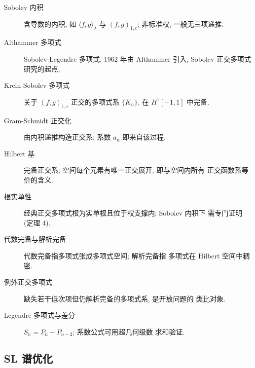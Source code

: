 \documentclass[UTF8]{ctexart}
\begin{document}
\begin{description}
	\item[Sobolev 内积] 含导数的内积, 如 $\langle f, g \rangle_\lambda$ 与
		$(f, g)_{1,c}$; 非标准权, 一般无三项递推.
	\item[Althammer 多项式] Sobolev-Legendre 多项式, 1962 年由 Althammer 引入,
		Sobolev 正交多项式研究的起点.
	\item[Krein-Sobolev 多项式] 关于 $(f, g)_{1,c}$ 正交的多项式系 $\{K_n\}$,
		在 $H^1[-1,1]$ 中完备.
	\item[Gram-Schmidt 正交化] 由内积递推构造正交系; 系数 $a_n$ 即来自该过程.
	\item[Hilbert 基] 完备正交系; 空间每个元素有唯一正交展开, 即与空间内所有
		正交函数系等价的含义.
	\item[根实单性] 经典正交多项式根为实单根且位于权支撑内; Sobolev 内积下
		需专门证明 (定理 4).
	\item[代数完备与解析完备] 代数完备指多项式张成多项式空间; 解析完备指
		多项式在 Hilbert 空间中稠密.
	\item[例外正交多项式] 缺失若干低次项但仍解析完备的多项式系, 是开放问题的
		类比对象.
	\item[Legendre 多项式与差分] $S_n = P_n - P_{n-2}$; 系数公式可用超几何级数
		求和验证.
\end{description}

\subsection{SL 谱优化}
\end{document}
